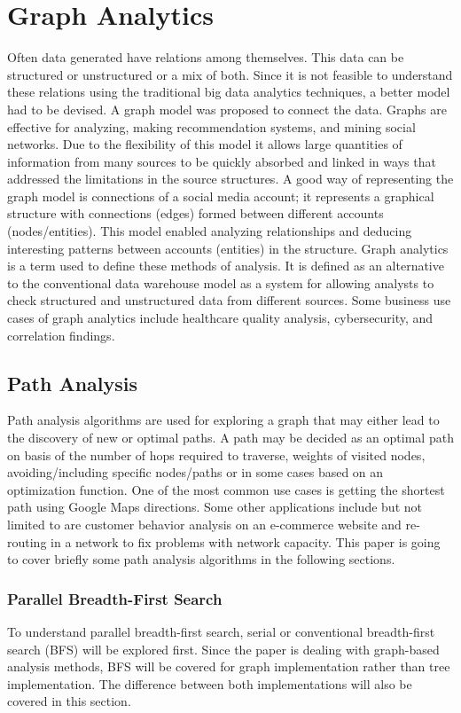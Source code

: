 \documentclass[journal,twoside,web]{ieeecolor}
\begin{document}
\section{Graph Analytics}
\label{sec:lit_review}
Often data generated have relations among themselves. This data can be structured or unstructured or a mix of both. Since it is not feasible to understand these relations using the traditional big data analytics techniques, a better model had to be devised. A graph model was proposed to connect the data. Graphs are effective for analyzing, making recommendation systems, and mining social networks. Due to the flexibility of this model it allows large quantities of information from many sources to be quickly absorbed and linked in ways that addressed the limitations in the source structures. A good way of representing the graph model is connections of a social media account; it represents a graphical structure with connections (edges) formed between different accounts (nodes/entities). This model enabled analyzing relationships and deducing interesting patterns between accounts (entities) in the structure. Graph analytics is a term used to define these methods of analysis. It is defined as an alternative to the conventional data warehouse model as a system for allowing analysts to check structured and unstructured data from different sources. Some business use cases of graph analytics include healthcare quality analysis, cybersecurity, and correlation findings.

\subsection{Path Analysis}
Path analysis algorithms are used for exploring a graph that may either lead to the discovery of new or optimal paths. A path may be decided as an optimal path on basis of the number of hops required to traverse, weights of visited nodes, avoiding/including specific nodes/paths or in some cases based on an optimization function. One of the most common use cases is getting the shortest path using Google Maps directions. Some other applications include but not limited to are customer behavior analysis on an e-commerce website and re-routing in a network to fix problems with network capacity. This paper is going to cover briefly some path analysis algorithms in the following sections.

\subsubsection{Parallel Breadth-First Search}
To understand parallel breadth-first search, serial or conventional breadth-first search (BFS) will be explored first. Since the paper is dealing with graph-based analysis methods, BFS will be covered for graph implementation rather than tree implementation. The difference between both implementations will also be covered in this section.
\end{document}
